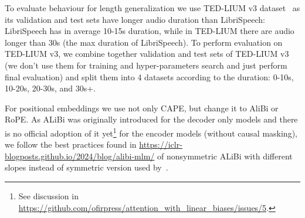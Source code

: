 To evaluate behaviour for length generalization we use TED-LIUM v3 dataset~\citet{hernandez2018ted} as its validation and test sets have longer audio duration than LibriSpeech: LibriSpeech has in average 10-15s duration, while in TED-LIUM there are audio longer than 30s (the max duration of LibriSpeech).
To perform evaluation on TED-LIUM v3, we combine together validation and test sets of TED-LIUM v3 (we don't use them for training and hyper-parameters search and just perform final evaluation) and split them into 4 datasets according to the duration: 0-10s, 10-20s, 20-30s, and 30s+.

For positional embeddings we use not only CAPE, but change it to AliBi or RoPE. 
As ALiBi was originally introduced for the decoder only models and there is no official adoption of it yet\footnote{See discussion in \url{https://github.com/ofirpress/attention_with_linear_biases/issues/5}.} for the encoder models (without causal masking), we follow the best practices found in \url{https://iclr-blogposts.github.io/2024/blog/alibi-mlm/} of nonsymmetric ALiBi with different slopes instead of symmetric version used by~\citep{lee2022littlebird}.

